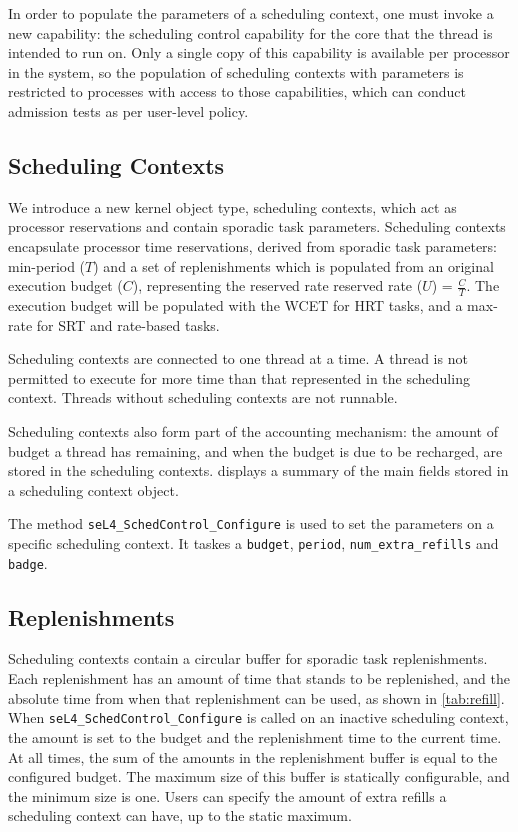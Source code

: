 In order to populate the parameters of a scheduling context, one must invoke a new capability: the scheduling control capability for the core that the thread is intended to run on.
Only a single copy of this capability is available per processor in the system, so the population of scheduling contexts with parameters is restricted to processes with access to those capabilities, which can conduct admission tests as per user-level policy.

\subsection{Scheduling Contexts}
\label{sec:schedcontext}

We introduce a new kernel object type, scheduling contexts, which act as processor reservations and contain sporadic task parameters.
Scheduling contexts encapsulate processor time reservations, derived from sporadic task parameters: min-period ($T$) and a set of replenishments which is populated from an original execution budget ($C$), representing the reserved rate reserved rate ($U$) = $\frac{C}{T}$.
The execution budget will be populated with the \gls{WCET} for \gls{HRT} tasks, and a max-rate for \gls{SRT} and rate-based tasks.

Scheduling contexts are connected to one thread at a time.
A thread is not permitted to execute for more time than that represented in the scheduling context.
Threads without scheduling contexts are not runnable.

Scheduling contexts also form part of the accounting mechanism: the amount of budget a thread has remaining, and when the budget is due to be recharged, are stored in the scheduling contexts.
 displays a summary of the main fields stored in a scheduling context object.

The method \texttt{seL4\_SchedControl\_Configure} is used to set the parameters on a specific scheduling context.
It taskes a \texttt{budget}, \texttt{period}, \texttt{num\_extra\_refills} and \texttt{badge}.

\subsection{Replenishments}
\label{sec:replenishments}

Scheduling contexts contain a circular buffer for sporadic task replenishments.
Each replenishment has an amount of time that stands to be replenished, and the absolute time from when that replenishment can be used, as shown in \cref{tab:refill}.
When \texttt{seL4\_SchedControl\_Configure} is called on an inactive scheduling context, the amount is set to the budget and the replenishment time to the current time.
At all times, the sum of the amounts in the replenishment buffer is equal to the configured budget.
The maximum size of this buffer is statically configurable, and the minimum size is one.
Users can specify the amount of extra refills a scheduling context can have, up to the static maximum.

